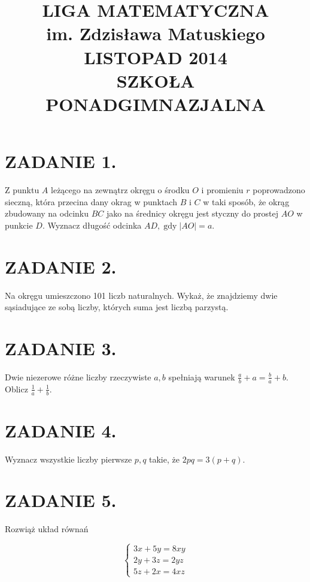 \documentclass[10pt]{article}
\title{LIGA MATEMATYCZNA \\
 im. Zdzisława Matuskiego \\
 LISTOPAD 2014 \\
 SZKOŁA PONADGIMNAZJALNA }
\author{}
\date{}
\begin{document}
\maketitle
\section*{ZADANIE 1.}
Z punktu \(A\) leżącego na zewnątrz okręgu o środku \(O\) i promieniu \(r\) poprowadzono sieczną, która przecina dany okrag w punktach \(B\) i \(C\) w taki sposób, że okrąg zbudowany na odcinku \(B C\) jako na średnicy okręgu jest styczny do prostej \(A O\) w punkcie \(D\). Wyznacz długość odcinka \(A D, \operatorname{gdy}|A O|=a\).

\section*{ZADANIE 2.}
Na okręgu umieszczono 101 liczb naturalnych. Wykaż, że znajdziemy dwie sąsiadujące ze sobą liczby, których suma jest liczbą parzystą.

\section*{ZADANIE 3.}
Dwie niezerowe różne liczby rzeczywiste \(a, b\) spełniają warunek \(\frac{a}{b}+a=\frac{b}{a}+b\). Oblicz \(\frac{1}{a}+\frac{1}{b}\).

\section*{ZADANIE 4.}
Wyznacz wszystkie liczby pierwsze \(p, q\) takie, że \(2 p q=3(p+q)\).

\section*{ZADANIE 5.}
Rozwiąż układ równań

\[
\left\{\begin{array}{l}
3 x+5 y=8 x y \\
2 y+3 z=2 y z \\
5 z+2 x=4 x z
\end{array}\right.
\]
\end{document}
